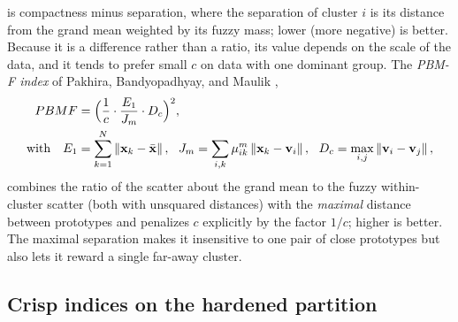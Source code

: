 is compactness minus separation, where the separation of cluster $i$ is its distance from the grand mean weighted by its fuzzy mass; lower (more negative) is better. Because it is a difference rather than a ratio, its value depends on the scale of the data, and it tends to prefer small $c$ on data with one dominant group. The \emph{PBM-F index} of Pakhira, Bandyopadhyay, and Maulik \cite{pakhira:2004:pbmf},
\begin{align}
  PBMF&=\Bigl(\frac1c\cdot\frac{E_1}{J_m}\cdot D_c\Bigr)^2,\label{eq:val:pbmf}\\
  \text{with}\quad E_1&=\sum_{k=1}^{N}\norm{\xk-\bar{\mathbf{x}}},\ \ 
  J_m=\sum_{i,k}\mik^m\norm{\xk-\vi},\ \ 
  D_c=\max_{i,j}\norm{\vi-\mathbf{v}_j},\notag
\end{align}
combines the ratio of the scatter about the grand mean to the fuzzy within-cluster scatter (both with unsquared distances) with the \emph{maximal} distance between prototypes and penalizes $c$ explicitly by the factor $1/c$; higher is better. The maximal separation makes it insensitive to one pair of close prototypes but also lets it reward a single far-away cluster.

\subsection{Crisp indices on the hardened partition}\label{sec:val:crisp}

